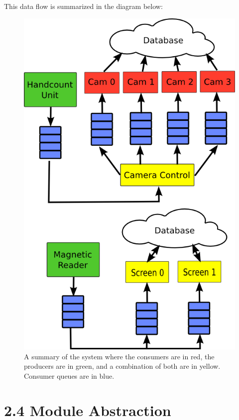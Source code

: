 \documentclass[12pt]{report}
\begin{document}
This data flow is summarized in the diagram below:
\begin{figure}[h]
\centering
\includegraphics[scale=0.50]{system_diagram}
\caption{A summary of the system where the consumers are in red, the producers are in green, and a combination of both are in yellow. Consumer queues are in blue.}
\end{figure}

\newpage\thispagestyle{fancy}\sectionfont{\scshape}
\section*{2.4 Module Abstraction}
\end{document}
